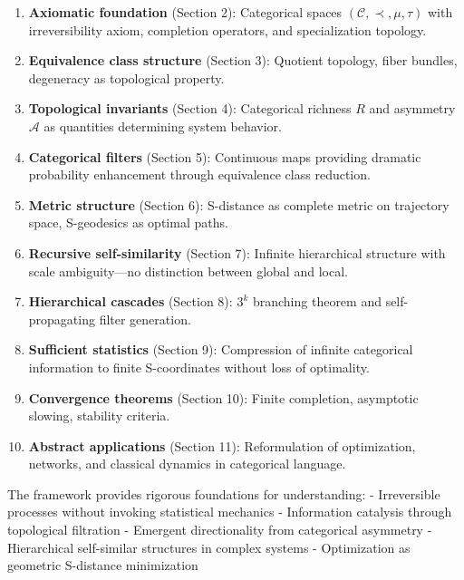 \documentclass[12pt,a4paper]{article}
\begin{document}
\begin{enumerate}
\item \textbf{Axiomatic foundation} (Section 2): Categorical spaces $(\mathcal{C}, \prec, \mu, \tau)$ with irreversibility axiom, completion operators, and specialization topology.

\item \textbf{Equivalence class structure} (Section 3): Quotient topology, fiber bundles, degeneracy as topological property.

\item \textbf{Topological invariants} (Section 4): Categorical richness $R$ and asymmetry $\mathcal{A}$ as quantities determining system behavior.

\item \textbf{Categorical filters} (Section 5): Continuous maps providing dramatic probability enhancement through equivalence class reduction.

\item \textbf{Metric structure} (Section 6): S-distance as complete metric on trajectory space, S-geodesics as optimal paths.

\item \textbf{Recursive self-similarity} (Section 7): Infinite hierarchical structure with scale ambiguity—no distinction between global and local.

\item \textbf{Hierarchical cascades} (Section 8): $3^k$ branching theorem and self-propagating filter generation.

\item \textbf{Sufficient statistics} (Section 9): Compression of infinite categorical information to finite S-coordinates without loss of optimality.

\item \textbf{Convergence theorems} (Section 10): Finite completion, asymptotic slowing, stability criteria.

\item \textbf{Abstract applications} (Section 11): Reformulation of optimization, networks, and classical dynamics in categorical language.
\end{enumerate}

The framework provides rigorous foundations for understanding:
- Irreversible processes without invoking statistical mechanics
- Information catalysis through topological filtration
- Emergent directionality from categorical asymmetry
- Hierarchical self-similar structures in complex systems
- Optimization as geometric S-distance minimization
\end{document}
